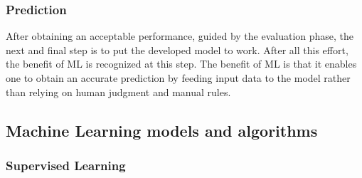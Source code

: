 \subsubsection{Prediction}

After obtaining an acceptable performance, guided by the evaluation phase, the next and final step is to put the developed model to work. After all this effort, the benefit of \gls{ML} is recognized at this step. The benefit of \gls{ML} is that it enables one to obtain an accurate prediction by feeding input data to the model rather than relying on human judgment and manual rules.

\subsection{Machine Learning models and algorithms}

\subsubsection{Supervised Learning}

